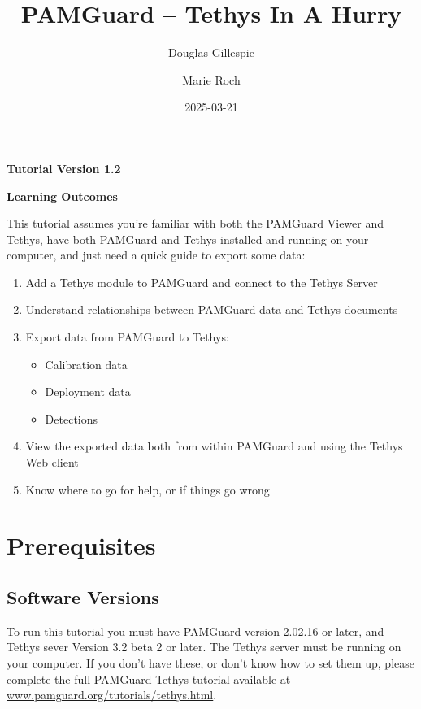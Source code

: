 \documentclass[
]{article}
\title{PAMGuard -- Tethys In A Hurry}
\author[1]{Douglas Gillespie}
\author[2]{Marie Roch}
\affil[1]{Sea Mammal Research Unit, University of St Andrews}
\affil[2]{Department of Computer Science, San Diego State University}
\date{2025-03-21}
\renewcommand*\contentsname{Table of contents}
\newcommand\contentsname{Table of contents}
\begin{document}
\maketitle

\centerline{\textbf{Tutorial Version 1.2}}
\vspace{3cm}

\centerline{\textbf{Learning Outcomes}}

This tutorial assumes you're familiar with both the PAMGuard Viewer and Tethys,
have both PAMGuard and Tethys installed and
running on your computer, and just need a quick guide to export some data:
\begin{enumerate}
\item Add a Tethys module to PAMGuard and connect to the Tethys Server
\item Understand relationships between PAMGuard data and Tethys documents
\item Export data from PAMGuard to Tethys:
\begin{itemize}
\item Calibration data
\item Deployment data
\item Detections
\end{itemize}
\item View the exported data both from within PAMGuard and using the Tethys Web client
\item Know where to go for help, or if things go wrong
\end{enumerate}
\newpage

\renewcommand*\contentsname{Table of contents}
{
\hypersetup{linkcolor=}
\setcounter{tocdepth}{3}
\tableofcontents
}
\listoffigures
\listoftables

\newpage{}

\pagestyle{plain}

\section{Prerequisites}\label{prerequisites}

\subsection{Software Versions}\label{software-versions}

To run this tutorial you must have PAMGuard version 2.02.16 or later,
and Tethys sever Version 3.2 beta 2 or later. The Tethys server must be
running on your computer. If you don't have these, or don't know how to
set them up, please complete the full PAMGuard Tethys tutorial available
at
\href{https://www.pamguard.org/tutorials/tethys.html}{www.pamguard.org/tutorials/tethys.html}.
\end{document}

